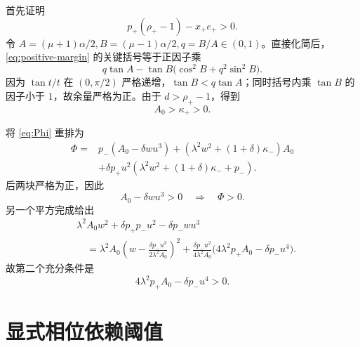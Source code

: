 \documentclass[UTF8,12pt,openany,fontset=fandol]{ctexrep}
\theoremstyle{definition}
\begin{document}
首先证明
\begin{equation}\label{eq:positive-margin}
 p_+(\rho_+-1)-x_+e_+>0.
\end{equation}
令 $A=(\mu+1)\alpha/2,B=(\mu-1)\alpha/2,q=B/A\in(0,1)$。直接化简后，\eqref{eq:positive-margin} 的关键括号等于正因子乘
\begin{equation}
 q\tan A-\tan B\bigl(\cos^2B+q^2\sin^2B\bigr).
\end{equation}
因为 $\tan t/t$ 在 $(0,\pi/2)$ 严格递增，$\tan B<q\tan A$；同时括号内乘 $\tan B$ 的因子小于 $1$，故余量严格为正。由于 $d>\rho_+-1$，得到
\begin{equation}
 A_0>\kappa_+>0.
\end{equation}

将 \eqref{eq:Phi} 重排为
\begin{align}
 \Phi={}&p_-(A_0-\delta wu^3)
 +(\lambda^2w^2+(1+\delta)\kappa_-)A_0\nonumber\\
 &+\delta p_+u^2(\lambda^2w^2+(1+\delta)\kappa_-+p_-).\label{eq:threepositive}
\end{align}
后两块严格为正，因此
\begin{equation}
 A_0-\delta wu^3>0\quad\Longrightarrow\quad\Phi>0.
\end{equation}
另一个平方完成给出
\begin{align*}
 &\lambda^2A_0w^2+\delta p_+p_-u^2-\delta p_-wu^3\\
 &\quad=\lambda^2A_0\left(w-\frac{\delta p_-u^3}{2\lambda^2A_0}\right)^2
 +\frac{\delta p_-u^2}{4\lambda^2A_0}
 \bigl(4\lambda^2p_+A_0-\delta p_-u^4\bigr).
\end{align*}
故第二个充分条件是
\begin{equation}
 4\lambda^2p_+A_0-\delta p_-u^4>0.
\end{equation}

\section{显式相位依赖阈值}
\end{document}

